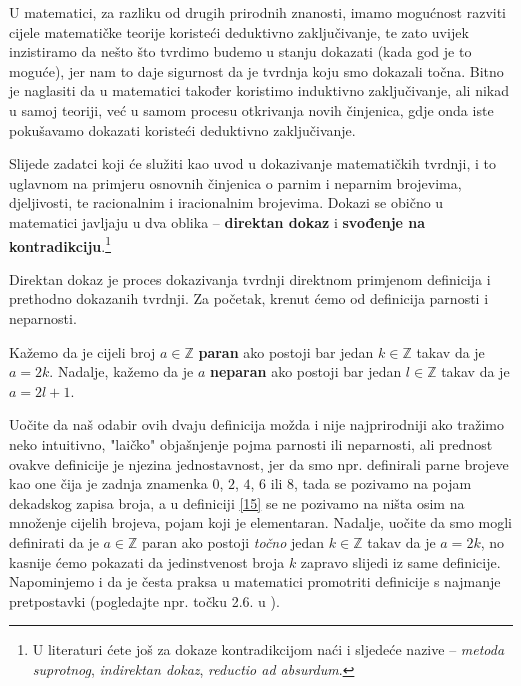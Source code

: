 U matematici, za razliku od drugih prirodnih znanosti, imamo mogućnost razviti cijele matematičke teorije koristeći deduktivno zaključivanje, te zato uvijek inzistiramo da nešto što tvrdimo budemo u stanju dokazati (kada god je to moguće), jer nam to daje sigurnost da je tvrdnja koju smo dokazali točna. Bitno je naglasiti da u matematici također koristimo induktivno zaključivanje, ali nikad u samoj teoriji, već u samom procesu otkrivanja novih činjenica, gdje onda iste pokušavamo dokazati koristeći deduktivno zaključivanje. 

Slijede zadatci koji će služiti kao uvod u dokazivanje matematičkih tvrdnji, i to uglavnom na primjeru osnovnih činjenica o parnim i neparnim brojevima, djeljivosti, te racionalnim i iracionalnim brojevima. Dokazi se obično u matematici javljaju u dva oblika -- \textbf{direktan dokaz} i \textbf{svođenje na kontradikciju}.\footnote{U literaturi ćete još za dokaze kontradikcijom naći i sljedeće nazive -- \textit{metoda suprotnog}, \textit{indirektan dokaz}, \textit{reductio ad absurdum}.}

Direktan dokaz je proces dokazivanja tvrdnji direktnom primjenom definicija i prethodno dokazanih tvrdnji. Za početak, krenut ćemo od definicija parnosti i neparnosti.

\begin{definition}
\label{15}
Kažemo da je cijeli broj \(a\in \mathbb{Z}\) \textbf{paran} ako postoji bar jedan \(k\in \mathbb{Z}\) takav da je \(a=2k\). Nadalje, kažemo da je \(a\) \textbf{neparan} ako postoji bar jedan \(l\in \mathbb{Z}\) takav da je \(a=2l+1\).
\end{definition}

Uočite da naš odabir ovih dvaju definicija možda i nije najprirodniji ako tražimo neko intuitivno, "laičko" objašnjenje pojma parnosti ili neparnosti, ali prednost ovakve definicije je njezina jednostavnost, jer da smo npr. definirali parne brojeve kao one čija je zadnja znamenka \(0\), \(2\), \(4\), \(6\) ili \(8\), tada se pozivamo na pojam dekadskog zapisa broja, a u definiciji \ref{15} se ne pozivamo na ništa osim na množenje cijelih brojeva, pojam koji je elementaran. Nadalje, uočite da smo mogli definirati da je \(a\in \mathbb{Z}\) paran ako postoji \textit{točno} jedan \(k\in \mathbb{Z}\) takav da je \(a=2k\), no kasnije ćemo pokazati da jedinstvenost broja \(k\) zapravo slijedi iz same definicije. Napominjemo i da je česta praksa u matematici promotriti definicije s najmanje pretpostavki (pogledajte npr. točku 2.6. u \cite{2}).

